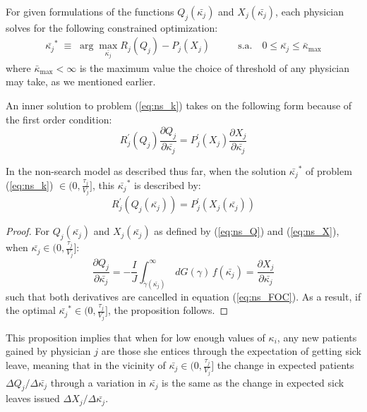 \documentclass[../main.tex]{subfiles}
\begin{document}
For given formulations of the functions $Q_j(\bar{\kappa_j})$ and $X_j(\bar{\kappa_j})$, each physician solves for the following constrained optimization:
\begin{align}
\bar{\kappa_j}^* \; \equiv \; \operatorname{arg}\max_{\bar{\kappa_j}} R_j(Q_j) - P_j(X_j) & \hspace{2em} \text{s.a.} \hspace{1em} 0 \leq \bar{\kappa_j} \leq \bar{\kappa}_{\max}
\label{eq:ns_k}
\end{align}
where $\bar{\kappa}_{\max} < \infty$ is the maximum value the choice of threshold of any physician may take, as we mentioned earlier.

An inner solution to problem (\ref{eq:ns_k}) takes on the following form because of the first order condition:
\begin{equation}
    R_j^{\prime}(Q_j)\frac{\partial Q_j}{\partial\bar{\kappa_j}}  = P_j^{\prime}(X_j)\frac{\partial X_j}{\partial \bar{\kappa_j}}
\label{eq:ns_FOC}
\end{equation}

\vspace{0.5em}

\begin{prop}
    \label{ns_prop}
In the non-search model as described thus far, when the solution $\bar{\kappa_j}^*$ of problem (\ref{eq:ns_k}) $\in (0,\frac{\tau_j}{V_j}]$, this $\bar{\kappa_j}^*$ is described by: 
\begin{equation*}
    R_j^{\prime}(Q_j(\bar{\kappa_j}))  = P_j^{\prime}(X_j(\bar{\kappa_j}))
\end{equation*}
\end{prop}

\begin{proof}
For $Q_j(\bar{\kappa_j})$ and $X_j(\bar{\kappa_j})$ as defined by (\ref{eq:ns_Q}) and (\ref{eq:ns_X}), when $\bar{\kappa_j} \in (0,\frac{\tau_j}{V_j}]$:
\[
\frac{\partial Q_j}{\partial\bar{\kappa_j}} = - \frac{I}{J} \int_{\tilde{\gamma}(\bar{\kappa_j})}^{\infty} \,dG(\gamma) \,f(\bar{\kappa_j}) = \frac{\partial X_j}{\partial\bar{\kappa_j}}
\]
such that both derivatives are cancelled in equation (\ref{eq:ns_FOC}). As a result, if the optimal $\bar{\kappa_j}^* \in (0,\frac{\tau_j}{V_j}]$, the proposition follows.
\end{proof}

This proposition implies that when for low enough values of $\kappa_i$, any new patients gained by physician $j$ are those she entices through the expectation of getting sick leave, meaning that in the vicinity of $\bar{\kappa_j} \in (0,\frac{\tau_j}{V_j}]$ the change in expected patients $\Delta Q_j/\Delta\bar{\kappa_j}$ through a variation in $\bar{\kappa_j}$ is the same as the change in expected sick leaves issued $\Delta X_j/\Delta \bar{\kappa_j}$.
\end{document}
